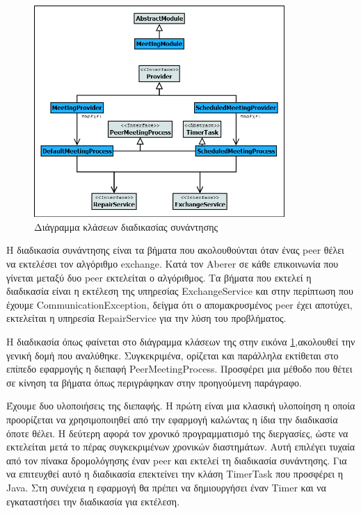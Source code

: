 \begin{figure}[htbp]
  \begin{center}
    \includegraphics[width=0.85\textwidth]{Figures/Architecture/Process_Layer/MeetingProcess_ClassDiagram.png}
  \end{center}
  \caption{Διάγραμμα κλάσεων διαδικασίας συνάντησης}
  \label{fig:MeetingProcess}
\end{figure}

Η διαδικασία συνάντησης είναι τα βήματα που ακολουθούνται όταν 
ένας peer θέλει να εκτελέσει τον αλγόριθμο exchange. Κατά τον Aberer 
\citep{Abererb} σε κάθε επικοινωνία που γίνεται μεταξύ δυο peer 
εκτελείται ο αλγόριθμος. Τα βήματα που εκτελεί η διαδικασία είναι η 
εκτέλεση της υπηρεσίας ExchangeService και στην περίπτωση που έχουμε 
CommunicationException, δείγμα ότι ο απομακρυσμένος peer έχει αποτύχει, 
εκτελείται η υπηρεσία RepairService για την λύση του προβλήματος.

Η διαδικασία όπως φαίνεται στο διάγραμμα κλάσεων της στην εικόνα 
\ref{fig:MeetingProcess},ακολουθεί την γενική δομή που αναλύθηκε. 
Συγκεκριμένα, ορίζεται και παράλληλα εκτίθεται στο επίπεδο εφαρμογής 
η διεπαφή PeerMeetingProcess. Προσφέρει μια μέθοδο που θέτει σε κίνηση τα βήματα 
όπως περιγράφηκαν στην προηγούμενη παράγραφο.

Έχουμε δυο υλοποιήσεις της διεπαφής. Η πρώτη είναι μια κλασική 
υλοποίηση η οποία προορίζεται να χρησιμοποιηθεί από την εφαρμογή 
καλώντας η ίδια την διαδικασία όποτε θέλει. Η δεύτερη αφορά τον χρονικό 
προγραμματισμό της διεργασίες, ώστε να εκτελείται μετά το πέρας 
συγκεκριμένων χρονικών διαστημάτων. Αυτή επιλέγει τυχαία από τον πίνακα 
δρομολόγησης έναν peer και εκτελεί τη διαδικασία συνάντησης. Για να 
επιτευχθεί αυτό η διαδικασία επεκτείνει την κλάση TimerTask που 
προσφέρει η Java. Στη συνέχεια η εφαρμογή θα πρέπει να δημιουργήσει έναν 
Timer και να εγκαταστήσει την διαδικασία για εκτέλεση.

